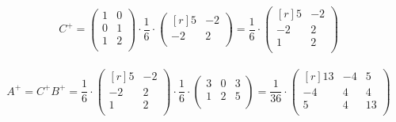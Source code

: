 \documentclass[12pt]{article}
\theoremstyle{definition}
\numberwithin{equation}{section}
\begin{document}
\[C^+ = \begin{pmatrix}
1 & 0 \\         
0 & 1 \\
1 & 2 \\
\end{pmatrix} \cdot \frac{1}{6} \cdot \begin{pmatrix}[r]
5 & -2 \\         
-2 & 2 \\
\end{pmatrix} = \frac{1}{6} \cdot \begin{pmatrix}[r]
5 & -2 \\         
-2 & 2 \\
1 & 2 \\
\end{pmatrix}\]\\
\[A^+ = C^+B^+ = \frac{1}{6} \cdot \begin{pmatrix}[r]
5 & -2 \\         
-2 & 2 \\
1 & 2 \\
\end{pmatrix} \cdot \frac{1}{6} \cdot \begin{pmatrix}
3 & 0 & 3 \\         
1 & 2 & 5 \\
\end{pmatrix} = \frac{1}{36} \cdot \begin{pmatrix}[r]
13 & -4 & 5 \\         
-4 & 4 & 4 \\
5 & 4 & 13 \\
\end{pmatrix}\]\\
\\
\end{document}
